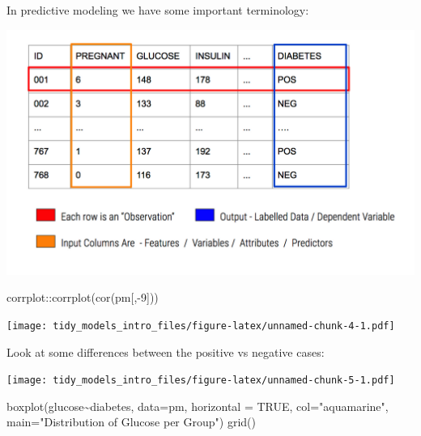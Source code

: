 \documentclass[
]{article}
\newenvironment{Shaded}{\begin{snugshade}}{\end{snugshade}}
\newcommand{\AttributeTok}[1]{\textcolor[rgb]{0.77,0.63,0.00}{#1}}
\newcommand{\ConstantTok}[1]{\textcolor[rgb]{0.00,0.00,0.00}{#1}}
\newcommand{\DecValTok}[1]{\textcolor[rgb]{0.00,0.00,0.81}{#1}}
\newcommand{\FunctionTok}[1]{\textcolor[rgb]{0.00,0.00,0.00}{#1}}
\newcommand{\NormalTok}[1]{#1}
\newcommand{\OtherTok}[1]{\textcolor[rgb]{0.56,0.35,0.01}{#1}}
\newcommand{\SpecialCharTok}[1]{\textcolor[rgb]{0.00,0.00,0.00}{#1}}
\newcommand{\StringTok}[1]{\textcolor[rgb]{0.31,0.60,0.02}{#1}}
\begin{document}
In predictive modeling we have some important terminology:

\includegraphics{./IMG/features.png}

\begin{Shaded}
\begin{Highlighting}[]
\NormalTok{corrplot}\SpecialCharTok{::}\FunctionTok{corrplot}\NormalTok{(}\FunctionTok{cor}\NormalTok{(pm[,}\SpecialCharTok{{-}}\DecValTok{9}\NormalTok{]))}
\end{Highlighting}
\end{Shaded}

\texttt{[image: tidy\_models\_intro\_files/figure-latex/unnamed-chunk-4-1.pdf]}

Look at some differences between the positive vs negative cases:

\begin{Shaded}
\end{Shaded}

\texttt{[image: tidy\_models\_intro\_files/figure-latex/unnamed-chunk-5-1.pdf]}

\begin{Shaded}
\begin{Highlighting}[]
\FunctionTok{boxplot}\NormalTok{(glucose}\SpecialCharTok{\textasciitilde{}}\NormalTok{diabetes,}
        \AttributeTok{data=}\NormalTok{pm,}
        \AttributeTok{horizontal =} \ConstantTok{TRUE}\NormalTok{,}
        \AttributeTok{col=}\StringTok{"aquamarine"}\NormalTok{,}
        \AttributeTok{main=}\StringTok{"Distribution of Glucose per Group"}\NormalTok{)}
\FunctionTok{grid}\NormalTok{()}
\end{Highlighting}
\end{Shaded}
\end{document}
